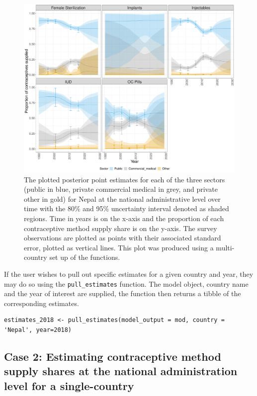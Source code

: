 \begin{figure}[H]
\includegraphics[width=1\linewidth,height=0.4\textheight]{figures/fig_3} \caption{The plotted posterior point estimates for each of the three sectors (public in blue, private commercial medical in grey, and private other in gold) for Nepal at the national administrative level over time with the 80\% and 95\% uncertainty interval denoted as shaded regions. Time in years is on the x-axis and the proportion of each contraceptive method supply share is on the y-axis. The survey observations are plotted as points with their associated standard error, plotted as vertical lines. This plot was produced using a multi-country set up of the  functions.}\label{fig:fig-3}
\end{figure}

If the user wishes to pull out specific estimates for a given country and year, they may do so using the \texttt{pull\_estimates} function. The model object, country name and the year of interest are supplied, the function then returns a tibble of the corresponding estimates.

\begin{verbatim}
estimates_2018 <- pull_estimates(model_output = mod, country = 'Nepal', year=2018)
\end{verbatim}

\hypertarget{case-2-estimating-contraceptive-method-supply-shares-at-the-national-administration-level-for-a-single-country}{%
\subsection{Case 2: Estimating contraceptive method supply shares at the national administration level for a single-country}\label{case-2-estimating-contraceptive-method-supply-shares-at-the-national-administration-level-for-a-single-country}}

